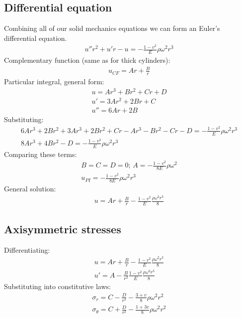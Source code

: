 \subsection{Differential equation}
Combining all of our solid mechanics equations we can form an Euler's differential equation.
\begin{gather}
    u''r^2 + u'r -u=-\frac{1-v^2}{E}\rho\omega^2 r^3
\end{gather}
Complementary function (same as for thick cylinders):
\begin{gather}
    u_{CF} = Ar + \frac{B}{r}
\end{gather}
Particular integral, general form:
\begin{gather}
    u = Ar^3 + Br^2 + Cr + D\\
    u' = 3Ar^2 + 2Br + C\\
    u'' = 6Ar + 2B
\end{gather}
Substituting:
\begin{gather}
    6Ar^3 + 2Br^2 + 3Ar^3 + 2Br^2 + Cr - Ar^3 - Br^2 - Cr - D = - \frac{1-v^2}{E} \rho \omega^2 r^3\\
    8 Ar^3 + 4Br^2 - D = - \frac{1-v^2}{E}\rho\omega^2 r^3
\end{gather}
Comparing these terms:
\begin{gather}
    B = C = D = 0; \, A = -\frac{1-v^2}{8E}\rho\omega^2\\
    u_{PI} = - \frac{1-v^2}{8E}\rho\omega^2 r^3
\end{gather}
General solution:
\begin{gather}
    u = Ar + \frac{B}{r} - \frac{1-v^2}{E} \frac{\rho\omega^2 r^3}{8}
\end{gather}
\subsection{Axisymmetric stresses}
Differentiating:
\begin{gather}
    u = Ar + \frac{B}{r} - \frac{1-v^2}{E} \frac{\rho\omega^2 r^3}{8}\\
    u' = A - \frac{B}{r^2} \frac{1-v^2}{E}\frac{\rho \omega^2 r^3}{8}
\end{gather}
Substituting into constitutive laws:
\begin{gather}
    \sigma_r = C - \frac{D}{r^2} - \frac{3 + v}{8}\rho \omega^2 r^2\\
    \sigma_{\theta} = C + \frac{D}{r^2} - \frac{1+ 3v}{8}\rho\omega^2 r^2
\end{gather}
